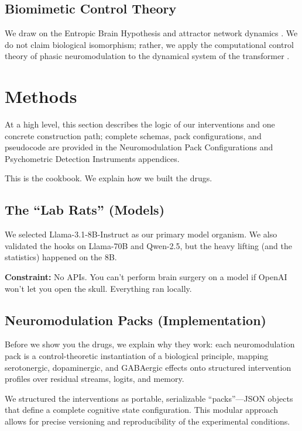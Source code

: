 \documentclass[10pt, twocolumn]{article}
\begin{document}
\subsection{Biomimetic Control Theory}
We draw on the Entropic Brain Hypothesis \cite{carhart2014, carhart2019} and attractor network dynamics \cite{khona2022}. We do not claim biological isomorphism; rather, we apply the computational control theory of phasic neuromodulation \cite{dayan2006} to the dynamical system of the transformer \cite{sussillo2013}.

\section{Methods}
At a high level, this section describes the logic of our interventions and one concrete construction path; complete schemas, pack configurations, and pseudocode are provided in the Neuromodulation Pack Configurations and Psychometric Detection Instruments appendices.


This is the cookbook. We explain how we built the drugs.

\subsection{The ``Lab Rats'' (Models)}
We selected Llama-3.1-8B-Instruct as our primary model organism. We also validated the hooks on Llama-70B and Qwen-2.5, but the heavy lifting (and the statistics) happened on the 8B.

\textbf{Constraint:} No APIs. You can't perform brain surgery on a model if OpenAI won't let you open the skull. Everything ran locally.

\subsection{Neuromodulation Packs (Implementation)}
Before we show you the drugs, we explain why they work: each neuromodulation pack is a control-theoretic instantiation of a biological principle, mapping serotonergic, dopaminergic, and GABAergic effects onto structured intervention profiles over residual streams, logits, and memory.

We structured the interventions as portable, serializable ``packs''—JSON objects that define a complete cognitive state configuration. This modular approach allows for precise versioning and reproducibility of the experimental conditions.
\end{document}
